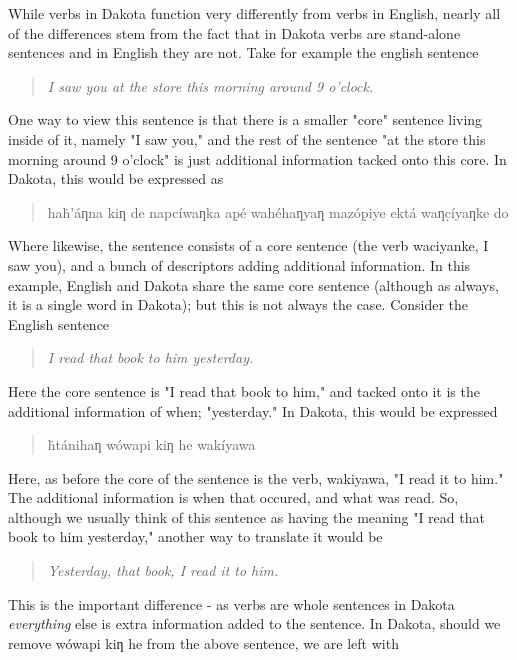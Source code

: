 \documentclass[10pt,letter]{article}
\newcommand\dak[1]{{\dakota #1}}
\newenvironment{sentence}
{
\begin{quote}\begin{center}
}
{\end{center}\end{quote}}
\begin{document}
While verbs in Dakota function very differently from verbs in English, nearly all of the differences stem from the fact that in Dakota verbs are stand-alone sentences and in English they are not.  Take for example the english sentence

\begin{sentence}
\emph{I saw you at the store this morning around 9 o'clock.}
\end{sentence}

One way to view this sentence is that there is a smaller "core" sentence living inside of it, namely "I saw you," and the rest of the sentence "at the store this morning around 9 o'clock" is just additional information tacked onto this core.  In Dakota, this would be expressed as

\begin{sentence}
\dak{haḣ’áƞna kiƞ de napcíwaƞka ap̣é wahéhaƞyaƞ mazóp̣iye ektá waƞc̣íyaƞke do}
\end{sentence}

Where likewise, the sentence consists of a core sentence (the verb waciyanke, I saw you), and a bunch of descriptors adding additional information.  In this example, English and Dakota share the same core sentence (although as always, it is a single word in Dakota); but this is not always the case.  Consider the English sentence

\begin{sentence}
\emph{I read that book to him yesterday.}
\end{sentence}

Here the core sentence is "I read that book to him," and tacked onto it is the additional information of when; "yesterday."  In Dakota, this would be expressed

\begin{sentence}
\dak{ḣtánihaƞ wówapi kiƞ he wakíyawa}
\end{sentence}

Here, as before the core of the sentence is the verb, wakiyawa, "I read it to him."  The additional information is when that occured, and what was read.  So, although we usually think of this sentence as having the meaning "I read that book to him yesterday," another way to translate it would be

\begin{sentence}
\emph{Yesterday, that book, I read it to him.}
\end{sentence}

This is the important difference - as verbs are whole sentences in Dakota \emph{everything} else is extra information added to the sentence. In Dakota, should we remove \dak{wówapi kiƞ he} from the above sentence, we are left with
\end{document}
